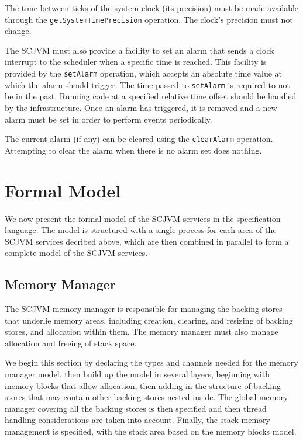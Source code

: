 \documentclass[a4paper,10pt]{report}
\begin{document}
The time between ticks of the system clock (its precision) must be
made available through the \texttt{get\-System\-Time\-Precision}
operation.
The clock's precision must not change.

The SCJVM must also provide a facility to set an alarm that sends a
clock interrupt to the scheduler when a specific time is reached.
This facility is provided by the \texttt{set\-Alarm} operation, which
accepts an absolute time value at which the alarm should trigger.
The time passed to \texttt{set\-Alarm} is required to not be in the
past.
Running code at a specified relative time offset should be handled by
the infrastructure.
Once an alarm has triggered, it is removed and a new alarm must be set
in order to perform events periodically.

The current alarm (if any) can be cleared using the
\texttt{clear\-Alarm} operation.
Attempting to clear the alarm when there is no alarm set does nothing.

\section{Formal Model}
\label{formal-model-section}

We now present the formal model of the SCJVM services in the \Circus{}
specification language.
The model is structured with a single process for each area of the
SCJVM services decribed above, which are then combined in parallel to
form a complete model of the SCJVM services.

\subsection{Memory Manager}
\label{memory-manager-model-section}

The SCJVM memory manager is responsible for managing the backing
stores that underlie memory areas, including creation, clearing, and
resizing of backing stores, and allocation within them.
The memory manager must also manage allocation and freeing of stack
space.

We begin this section by declaring the types and channels needed for
the memory manager model, then build up the model in several layers,
beginning with memory blocks that allow allocation, then adding in the
structure of backing stores that may contain other backing stores
nested inside.
The global memory manager covering all the backing stores is then
specified and then thread handling considerations are taken into account.
Finally, the stack memory management is specified, with the stack area
based on the memory blocks model.
\end{document}

